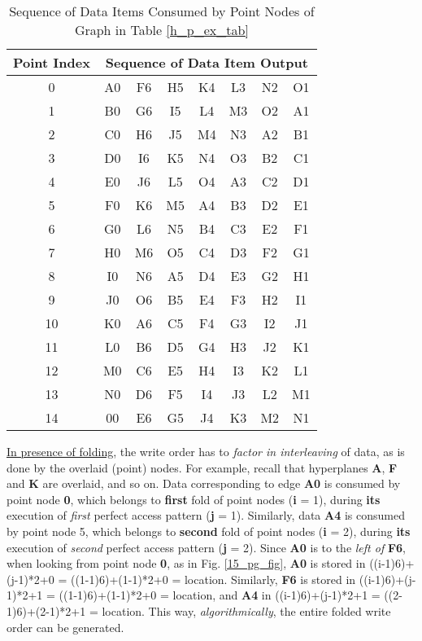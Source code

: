\documentclass[12pt]{article}
\begin{document}
\begin{table}[h]
\caption{Sequence of Data Items Consumed by Point Nodes of Graph in Table
\ref{h_p_ex_tab}}
\label{write_gen_tab}
\centering
{\normalsize
\begin{tabular}[!h]{|c|c|c|c|c|c|c|c|}
\hline
\textbf{Point Index} & \multicolumn{7}{|c|}{Sequence of Data Item
Output} \\ \hline \hline
0 & A0 & F6 & H5 & K4 & L3 & N2 & O1 \\ \hline
1 & B0 & G6 & I5 & L4 & M3 & O2 & A1 \\ \hline
2 & C0 & H6 & J5 & M4 & N3 & A2 & B1 \\ \hline
3 & D0 & I6 & K5 & N4 & O3 & B2 & C1 \\ \hline
4 & E0 & J6 & L5 & O4 & A3 & C2 & D1 \\ \hline
5 & F0 & K6 & M5 & A4 & B3 & D2 & E1 \\ \hline
6 & G0 & L6 & N5 & B4 & C3 & E2 & F1 \\ \hline
7 & H0 & M6 & O5 & C4 & D3 & F2 & G1 \\ \hline
8 & I0 & N6 & A5 & D4 & E3 & G2 & H1 \\ \hline
9 & J0 & O6 & B5 & E4 & F3 & H2 & I1 \\ \hline
10 & K0 & A6 & C5 & F4 & G3 & I2 & J1 \\ \hline
11 & L0 & B6 & D5 & G4 & H3 & J2 & K1 \\ \hline
12 & M0 & C6 & E5 & H4 & I3 & K2 & L1 \\ \hline
13 & N0 & D6 & F5 & I4 & J3 & L2 & M1 \\ \hline
14 & 00 & E6 & G5 & J4 & K3 & M2 & N1 \\ \hline

\end{tabular}
}
\end{table}

\uline{In presence of folding}, the write order has to \textit{factor in
interleaving} of data, as is done by the overlaid (point) nodes. 
For example, recall that hyperplanes \textbf{A}, \textbf{F} and \textbf{K} are
overlaid, and so on. Data corresponding to edge \textbf{A0} is consumed by
point node \textbf{0}, which belongs to \textbf{first} fold of point nodes
(\textbf{i} = 1), during \textbf{its} execution of \textit{first} perfect
access pattern (\textbf{j} = 1). Similarly,
data \textbf{A4} is consumed by point node 5, which belongs to
\textbf{second} fold of point nodes (\textbf{i} = 2), during \textbf{its} execution of
\textit{second} perfect access pattern (\textbf{j} = 2). Since \textbf{A0}
is to the \textit{left of} \textbf{F6}, when looking from point node
\textbf{0}, as in Fig.
\ref{15_pg_fig}, \textbf{A0} is stored in ((i-1)6)+(j-1)*2+0 =
((1-1)6)+(1-1)*2+0 =  location. Similarly,
\textbf{F6} is stored in ((i-1)6)+(j-1)*2+1 =
((1-1)6)+(1-1)*2+0 =  location, and \textbf{A4}
in ((i-1)6)+(j-1)*2+1 = ((2-1)6)+(2-1)*2+1 =
 location. This way, \textit{algorithmically}, the entire
folded write order can be generated.
\end{document}
